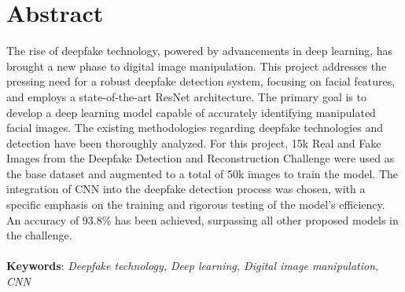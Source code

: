 \large
\chapter*{Abstract}
The rise of deepfake technology, powered by advancements in deep learning, has brought a new phase to digital image manipulation. This project addresses the pressing need for a robust deepfake detection system, focusing on facial features, and employs a state-of-the-art ResNet architecture. The primary goal is to develop a deep learning model capable of accurately identifying manipulated facial images. The existing methodologies regarding deepfake technologies and detection have been thoroughly analyzed. For this project, 15k Real and Fake Images from the Deepfake Detection and Reconstruction Challenge were used as the base dataset and augmented to a total of 50k images to train the model. The integration of CNN into the deepfake detection process was chosen, with a specific emphasis on the training and rigorous testing of the model’s efficiency. An accuracy of 93.8\% has been achieved, surpassing all other proposed models in the challenge.\\\\
\textbf{Keywords}: \textit{Deepfake technology, Deep learning, Digital image manipulation, CNN}
\pagebreak

\tableofcontents


